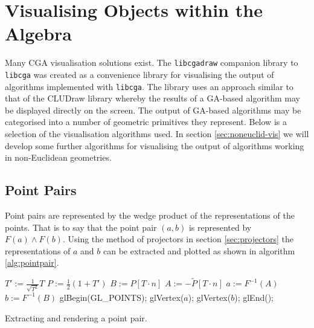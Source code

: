 



\section{Visualising Objects within the Algebra}

Many CGA visualisation solutions exist\cite{CLU}. The {\tt libcgadraw}
companion library to {\tt libcga} was created as a convenience library
for visualising the output of algorithms implemented with
{\tt libcga}. The library
uses an approach similar to that of the CLUDraw library whereby the results of 
a GA-based algorithm may be displayed directly on the screen.
The output of GA-based algorithms may be categorised into a number of
geometric primitives they represent. Below is a selection of the
visualisation algorithms used. In section \ref{sec:noneuclid-vis} we will
develop some further algorithms for visualising the output of algorithms
working in non-Euclidean geometries.

\subsection{Point Pairs}

Point pairs are represented by the wedge product of the representations of the
points. That is to say that the point pair $(a,b)$ is represented by $F(a) \wedge F(b)$.
Using the method of projectors in section \ref{sec:projectors} the representations
of $a$ and $b$ can be extracted and plotted as shown in algorithm \ref{alg:pointpair}.

\begin{fancyalg}
\begin{algorithmic}[1]
\STATE $T' := \frac{1}{\sqrt{T^2}}T$ %
\STATE $P := \frac{1}{2}(1+T')$
\STATE $B := P \left[ T\cdot n \right]$
\STATE $A := - \tilde{P} \left[ T \cdot n \right]$
\STATE $a := F^{-1}(A)$
\STATE $b := F^{-1}(B)$
\STATE glBegin(GL\_POINTS);
\STATE glVertex($a$); glVertex($b$);
\STATE glEnd();
\end{algorithmic}
\caption{\label{alg:pointpair}Extracting and rendering a point pair.}
\end{fancyalg}

